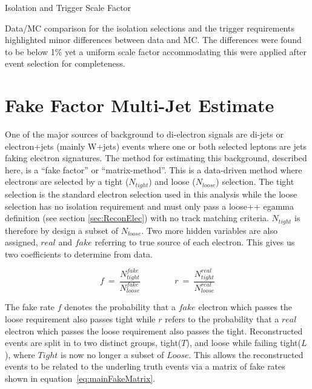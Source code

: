    {\bf\raggedright Isolation and Trigger Scale Factor}

   {\raggedright Data/MC comparison for the isolation selections and the trigger requirements highlighted minor differences between data and MC. The differences were found to be below 1\% yet a uniform scale factor accommodating this were applied after event selection for completeness.}




\section{Fake Factor Multi-Jet Estimate}
   \label{sec:FFmethod}

One of the major sources of background to di-electron signals are di-jets or electron+jets (mainly W+jets) events where one or both selected leptons are jets faking electron signatures. The method for estimating this background, described here, is a ``fake factor'' or ``matrix-method''. This is a data-driven method where electrons are selected by a tight ($N_{tight}$) and loose ($N_{loose}$) selection. The tight selection is the standard electron selection used in this analysis while the loose selection has no isolation requirement and must only pass a loose++ egamma definition (see section \ref{sec:ReconElec}) with no track matching criteria. $N_{tight}$ is therefore by design a subset of $N_{loose}$. Two more hidden variables are also assigned, $real$ and $fake$ referring to true source of each electron. This gives us two coefficients to determine from data.

\begin{equation} \label{eq:fakeRate}
   f~=~\frac{N^{fake}_{tight}}{N^{fake}_{loose}} \qquad \qquad r~=~\frac{N^{real}_{tight}}{N^{real}_{loose}}
\end{equation}

The fake rate $f$ denotes the probability that a $fake$ electron which passes the loose requirement also passes tight while $r$ refers to the probability that a $real$ electron which passes the loose requirement also passes the tight.
Reconstructed events are split in to two distinct groups, tight($T$), and loose while failing tight($L$), where $Tight$ is now no longer a subset of $Loose$. This allows the reconstructed events to be related to the underling truth events via a matrix of fake rates shown in equation~\ref{eq:mainFakeMatrix}.

